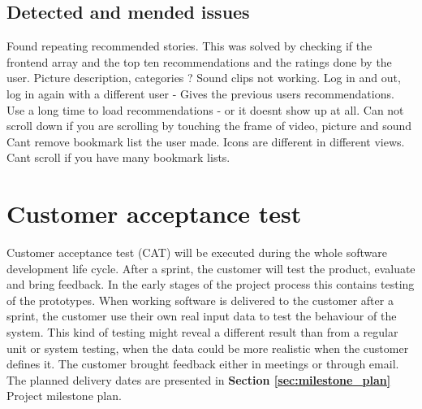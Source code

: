 			
			\subsection{Detected and mended issues}
		
			Found repeating recommended stories. This was solved by checking if the frontend array and the top ten recommendations and the ratings done by the user. 
			Picture description, 
			categories ? 
			Sound clips not working.
			Log in and out, log in again with a different user - Gives the previous users recommendations. 
			Use a long time to load recommendations - or it doesnt show up at all.
			Can not scroll down if you are scrolling by touching the frame of video, picture and sound 
			Cant remove bookmark list the user made.  
			Icons are different in different views.
			Cant scroll if you have many bookmark lists.
			
			\section{Customer acceptance test}
			\label{sec:acceptance_test}
			
			Customer acceptance test (CAT) will be executed during the whole software development life cycle. After a sprint, the customer will test the product, evaluate and bring feedback. In the early stages of the project process this contains testing of the prototypes. When working software is delivered to the customer after a sprint, the customer use their own real input data to test the behaviour of the system. This kind of testing might reveal a different result than from a regular unit or system testing, when the data could be more realistic when the customer defines it. The customer brought feedback either in meetings or through email. The planned delivery dates are presented in \textbf{Section \ref{sec:milestone_plan}} Project milestone plan.  
			
